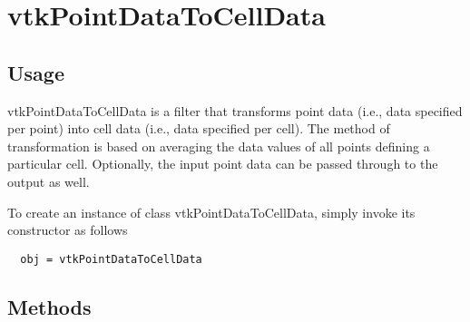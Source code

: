 \section{vtkPointDataToCellData}

\subsection{Usage}

 vtkPointDataToCellData is a filter that transforms point data (i.e., data
 specified per point) into cell data (i.e., data specified per cell).
 The method of transformation is based on averaging the data
 values of all points defining a particular cell. Optionally, the input point
 data can be passed through to the output as well.

To create an instance of class vtkPointDataToCellData, simply
invoke its constructor as follows
\begin{verbatim}
  obj = vtkPointDataToCellData
\end{verbatim}
\subsection{Methods}

